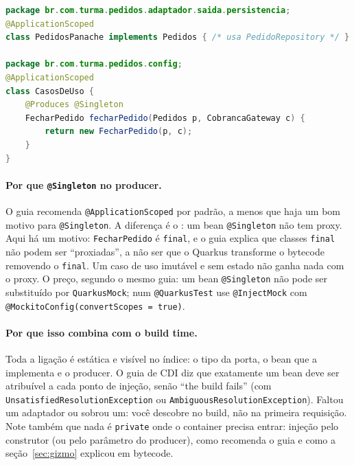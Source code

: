 \begin{lstlisting}[language=Java]
package br.com.turma.pedidos.adaptador.saida.persistencia;
@ApplicationScoped
class PedidosPanache implements Pedidos { /* usa PedidoRepository */ }

package br.com.turma.pedidos.config;
@ApplicationScoped
class CasosDeUso {
    @Produces @Singleton
    FecharPedido fecharPedido(Pedidos p, CobrancaGateway c) {
        return new FecharPedido(p, c);
    }
}
\end{lstlisting}

\paragraph{Por que \texttt{@Singleton} no producer.}
O guia  recomenda \texttt{@ApplicationScoped}
por padrão, a menos que haja um bom motivo para \texttt{@Singleton}. A
diferença é o : um bean
\texttt{@Singleton} não tem proxy. Aqui há um motivo: \texttt{FecharPedido}
é \texttt{final}, e o guia  explica
que classes \texttt{final} não podem ser \enquote{proxiadas}, a não ser que
o Quarkus transforme o bytecode removendo o \texttt{final}. Um caso de uso
imutável e sem estado não ganha nada com o proxy. O preço, segundo o
mesmo guia: um bean \texttt{@Singleton} não pode ser substituído por
\texttt{QuarkusMock}; num \texttt{@QuarkusTest} use \texttt{@InjectMock}
com \texttt{@MockitoConfig(convertScopes = true)}.

\paragraph{Por que isso combina com o build time.}
Toda a ligação é estática e visível no índice: o tipo da porta, o bean
que a implementa e o producer. O guia de CDI diz que exatamente um bean
deve ser atribuível a cada ponto de injeção, senão \enquote{the build
fails} (com \texttt{UnsatisfiedResolutionException} ou
\texttt{AmbiguousResolutionException}). Faltou um adaptador ou sobrou um:
você descobre no build, não na primeira requisição. Note também que nada é
\texttt{private} onde o container precisa entrar: injeção pelo construtor
(ou pelo parâmetro do producer), como recomenda o guia
 e como a
seção~\ref{sec:gizmo} explicou em bytecode.


